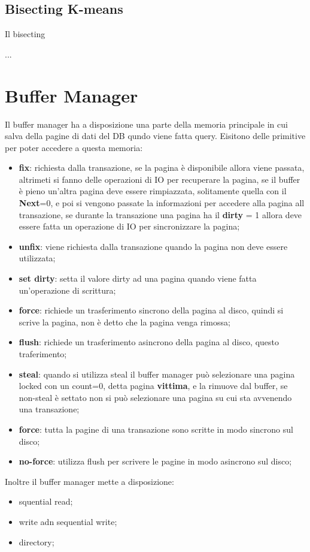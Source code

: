 \documentclass[12pt]{article}
\begin{document}
\subsection{Bisecting K-means}
Il bisecting

...




\section{Buffer Manager}
Il buffer manager ha a disposizione una parte della memoria principale in cui salva della pagine di dati del DB qundo viene fatta query. Eisitono delle primitive per poter accedere a questa memoria:
\begin{itemize}
    \item \textbf{fix}: richiesta dalla transazione, se la pagina \`e disponibile allora viene passata, altrimeti si fanno delle operazioni di IO per recuperare la pagina, se il buffer \`e pieno un'altra pagina deve essere rimpiazzata, solitamente quella con il \textbf{Next}=0, e poi si vengono passate la informazioni per accedere alla pagina all transazione, se durante la transazione una pagina ha il \textbf{dirty} = 1 allora deve essere fatta un operazione di IO per sincronizzare la pagina;
    \item \textbf{unfix}: viene richiesta dalla transazione quando la pagina non deve essere utilizzata;
    \item \textbf{set dirty}: setta il valore dirty ad una pagina quando viene fatta un'operazione di scrittura;
    \item \textbf{force}: richiede un trasferimento sincrono della pagina al disco, quindi si scrive la pagina, non \`e detto che la pagina venga rimossa;
    \item \textbf{flush}: richiede un trasferimento asincrono della pagina al disco, questo traferimento;
    \item \textbf{steal}: quando si utilizza steal il buffer manager pu\`o selezionare una pagina locked con un count=0, detta pagina \textbf{vittima}, e la rimuove dal buffer, se non-steal \`e settato non si pu\`o selezionare una pagina su cui sta avvenendo una transazione;
    \item \textbf{force}: tutta la pagine di una transazione sono scritte in modo sincrono sul disco;
    \item \textbf{no-force}: utilizza flush per scrivere le pagine in modo asincrono sul disco;
\end{itemize}
Inoltre il buffer manager mette a disposizione:
\begin{itemize}
    \item squential read;
    \item write adn sequential write;
    \item directory;
\end{itemize}
\end{document}
